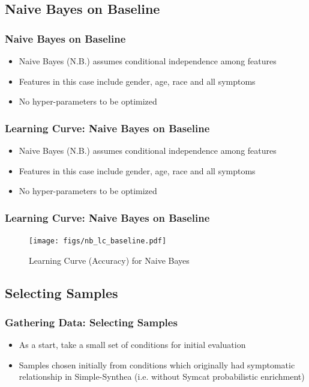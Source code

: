 \documentclass{beamer}
\begin{document}
\subsection{Naive Bayes on Baseline} %
\begin{frame}
\frametitle{Naive Bayes on Baseline}
\begin{itemize}
	\item Naive Bayes (N.B.) assumes conditional independence among features
	\item Features in this case include gender, age, race and all symptoms
	\item No hyper-parameters to be optimized
\end{itemize}
\end{frame}

\begin{frame}
\frametitle{Learning Curve: Naive Bayes on Baseline}
\begin{itemize}
	\item Naive Bayes (N.B.) assumes conditional independence among features
	\item Features in this case include gender, age, race and all symptoms
	\item No hyper-parameters to be optimized
\end{itemize}
\end{frame}

\begin{frame}
\frametitle{Learning Curve: Naive Bayes on Baseline}
\begin{figure}
	\texttt{[image: figs/nb\_lc\_baseline.pdf]}
	\caption{Learning Curve (Accuracy) for Naive Bayes}
\end{figure}
\end{frame}


\subsection{Selecting  Samples}
	\begin{frame}
	\frametitle{Gathering Data: Selecting  Samples}
	\begin{itemize}
		\item As a start, take a small set of conditions for initial evaluation
		\item Samples chosen initially from conditions which originally had symptomatic relationship in Simple-Synthea (i.e. without Symcat probabilistic enrichment) 
	\end{itemize}
	\end{frame}
\end{document}
